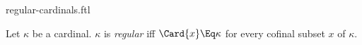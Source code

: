 \documentclass{stex}
\begin{document}
\begin{smodule}{regular-cardinals.ftl}



\begin{definition*}[forthel,for=regular]
  Let $\kappa$ be a cardinal.
  $\kappa$ is \emph{regular} iff $\Card{x} \Eq \kappa$ for every cofinal subset $x$ of $\kappa$.
\end{definition*}

\end{smodule}
\end{document}

